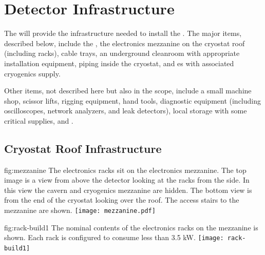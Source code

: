 \section{Detector Infrastructure}
\label{sec:fdsp-tc-infr}


The   will provide the infrastructure needed to install the . The major items, described below, include the , the electronics mezzanine on the cryostat roof (including racks), cable trays, an underground cleanroom with appropriate installation equipment, piping inside the cryostat, and \coldbox{}es with associated cryogenics supply. 

Other items, not described here but also in the  scope, include a small machine shop, scissor lifts, rigging equipment, hand tools, diagnostic equipment (including oscilloscopes, network analyzers, and leak detectors), local storage with some critical supplies, and .  



\subsection{Cryostat Roof Infrastructure}
\label{sec:fdsp-tc-infr-cryo-roof}

\begin{dunefigure}{fig:mezzanine}
  {The electronics racks sit on the  electronics mezzanine. The top image is a view from above the detector looking at the racks from the side. In this view the cavern and cryogenics mezzanine are hidden. The bottom view is from the end of the cryostat looking over the roof. The access stairs to the mezzanine are shown.}
 \texttt{[image: mezzanine.pdf]}
\end{dunefigure}

\begin{dunefigure}{fig:rack-build1}
  {The nominal contents of the electronics racks on the mezzanine is shown. Each rack is configured to consume less than 3.5 \si{kW}. }
 \texttt{[image: rack-build1]} 
\end{dunefigure}

